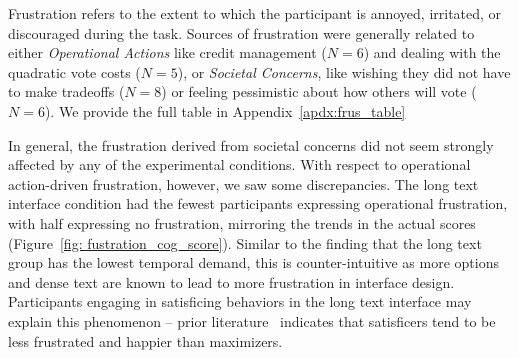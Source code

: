 Frustration refers to the extent to which the participant is annoyed, irritated, or discouraged during the task. Sources of frustration were generally related to either \textit{Operational Actions} like credit management ($N=6$) and dealing with the quadratic vote costs ($N=5$), or \textit{Societal Concerns},  like wishing they did not have to make tradeoffs ($N=8$) or feeling pessimistic about how others will vote ($N=6$). We provide the full table in Appendix~\ref{apdx:frus_table}

In general, the frustration derived from societal concerns did not seem strongly affected by any of the experimental conditions. With respect to operational action-driven frustration, however, we saw some discrepancies. The long text interface condition had the fewest participants expressing operational frustration, with half expressing no frustration, mirroring the trends in the actual scores (Figure~\ref{fig: fustration_cog_score}). Similar to the finding that the long text group has the lowest temporal demand, this is counter-intuitive as more options and dense text are known to lead to more frustration in interface design. Participants engaging in satisficing behaviors in the long text interface may explain this phenomenon -- prior literature~\cite{polmanWhyAreMaximizers2010, schwartzMaximizingSatisficingHappiness2002} indicates that satisficers tend to be less frustrated and happier than maximizers. 

